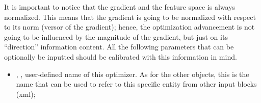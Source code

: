 It is important to notice that the gradient and the feature space is always normalized. This means that the gradient is going to be
normalized with respect to its norm (versor of the gradient); hence, the optimization advancement is not going to be influenced by the
magnitude of the gradient, but just on its ``direction'' information content. All the following parameters that can be optionally be inputted
should be calibrated with this information in mind.
%

%
\attrsIntro
\vspace{-5mm}
\begin{itemize}
\itemsep0em
\item {}, , user-defined name of this optimizer. \nb As for the other objects, this is
the name that can be used to refer to this specific entity from other input blocks (xml);
\end{itemize}
\vspace{-5mm}

